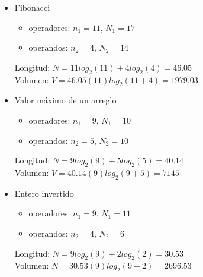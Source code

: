 \begin{itemize}
\item Fibonacci
  

  \begin{itemize}
  \item operadores: $n_1=11$, $N_1=17$
  \item operandos: $n_2=4$, $N_2=14$
  \end{itemize}

  Longitud: $N=11 log_2(11) + 4 log_2(4) = 46.05$ \\
  Volumen: $V = 46.05 (11)log_2(11 + 4) = 1979.03$

\item Valor máximo de un arreglo
  

  \begin{itemize}
  \item operadores: $n_1 = 9$, $N_1 = 10$
  \item operandos: $n_2 = 5$, $N_2 = 10$
  \end{itemize}

  Longitud: $N=9 log_2(9) + 5 log_2(5) = 40.14$ \\
  Volumen: $V = 40.14 (9)log_2(9+5) = 7145$

\item Entero invertido
  

  \begin{itemize}
  \item operadores: $n_1 = 9$, $N_1 = 11$
  \item operandos: $n_2 = 4$, $N_2 = 6$
  \end{itemize}

  Longitud: $N = 9 log_2(9) + 2 log_2(2) = 30.53$ \\
  Volumen: $N = 30.53 (9)log_2(9+2) = 2696.53$
\end{itemize}
